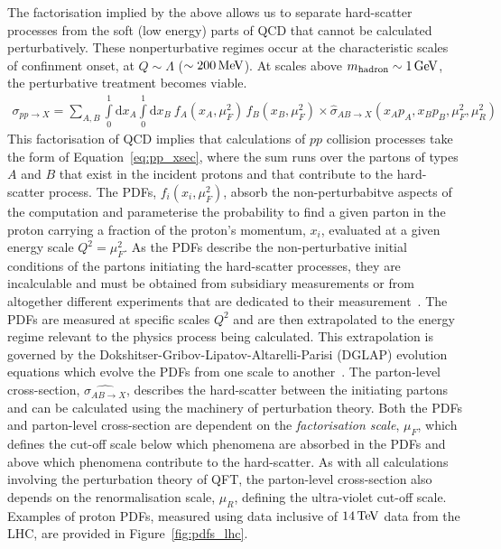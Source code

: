 The factorisation implied by the above allows us to separate hard-scatter processes from the soft (low energy) parts
of QCD that cannot be calculated perturbatively.
These nonperturbative regimes occur at the characteristic scales of confinment onset, at $Q \sim \Lambda$ ($\sim 200\,\text{Me\kern -0.1em V}$).
At scales above $m_{\text{hadron}} \sim 1\,\text{Ge\kern -0.1em V}$, the perturbative treatment becomes viable.
\begin{align}
    \sigma_{pp \rightarrow X} = \sum\limits_{A,B} \int\limits_0^1 \mathrm{d}x_A \int\limits_0^1 \mathrm{d}x_B \: f_{A}(x_A, \mu_F^2) \, f_{B}(x_B, \mu_F^2) \times \hat{\sigma}_{AB \rightarrow X}(x_A p_A, x_B p_B, \mu_F^2, \mu_R^2)
    \label{eq:pp_xsec}
\end{align}
This factorisation of QCD implies that calculations of $pp$ collision processes take the form of Equation~\ref{eq:pp_xsec},
where the sum runs over the partons of types $A$ and $B$ that exist in the incident protons and that contribute to the hard-scatter process.
The PDFs, $f_{i}(x_i, \mu_F^2)$, absorb the non-perturbabitve aspects of the computation and parameterise the probability
to find a given parton in the proton carrying a fraction of the proton's momentum, $x_i$, evaluated at a given energy scale
$Q^2 = \mu_F^2$.
As the PDFs describe the non-perturbative initial conditions of the partons initiating the hard-scatter processes,
they are incalculable and must be obtained from subsidiary measurements or from altogether
different experiments that are dedicated to their measurement~\cite{Placakyte:2011az,Ball:2012cx}.
The PDFs are measured at specific scales $Q^2$ and are then extrapolated to the energy regime relevant to the physics process
being calculated.
This extrapolation is governed by the Dokshitser-Gribov-Lipatov-Altarelli-Parisi (DGLAP)
evolution equations which evolve the PDFs from one scale to another~\cite{Altarelli:1977zs,Gribov:1972ri,Dokshitzer:1977sg}.
The parton-level cross-section, $\hat{\sigma_{AB \rightarrow X}}$, describes the hard-scatter between the initiating partons
and can be calculated using the machinery of perturbation theory.
Both the PDFs and parton-level cross-section are dependent on the \textit{factorisation scale}, $\mu_F$,
which defines the cut-off scale below which phenomena are absorbed in the PDFs and above which phenomena contribute to the
hard-scatter. 
As with all calculations involving the perturbation theory of QFT, the parton-level cross-section also depends on the
renormalisation scale, $\mu_R$, defining the ultra-violet cut-off scale.
Examples of proton PDFs, measured using data inclusive of $14\,\text{Te\kern -0.1em V}$ data from the LHC, are provided in Figure~\ref{fig:pdfs_lhc}.


